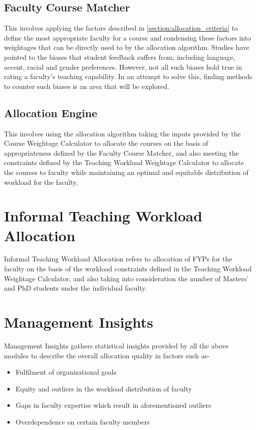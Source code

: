 \subsection{Faculty Course Matcher}

This involves applying the factors described in \autoref{section:allocation_criteria} to define the most appropriate faculty for a course and condensing these factors into weightages that can be directly used to by the allocation algorithm. Studies have pointed to the biases that student feedback suffers from, including language, accent, racial and gender preferences. However, not all such biases hold true in rating a faculty's teaching capability. In an attempt to solve this, finding methods to counter such biases is an area that will be explored.

\subsection{Allocation Engine}

This involves using the allocation algorithm taking the inputs provided by the Course Weightage Calculator to allocate the courses on the basis of appropriateness defined by the Faculty Course Matcher, and also meeting the constraints defined by the Teaching Workload Weightage Calculator to allocate the courses to faculty while maintaining an optimal and equitable distribution of workload for the faculty.

\section{Informal Teaching Workload Allocation}

Informal Teaching Workload Allocation refers to allocation of FYPs for the faculty on the basis of the workload constraints defined in the Teaching Workload Weightage Calculator, and also taking into consideration the number of Masters' and PhD students under the individual faculty.

\section{Management Insights}

Management Insights gathers statistical insights provided by all the above modules to describe the overall allocation quality in factors such as-
\begin{itemize}
    \item Fulfilment of organizational goals
    \item Equity and outliers in the workload distribution of faculty
    \item Gaps in faculty expertise which result in aforementioned outliers
    \item Overdependence on certain faculty members
\end{itemize}

